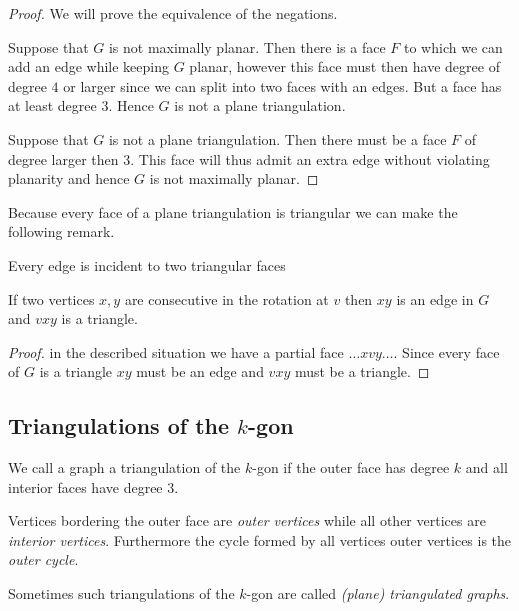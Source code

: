 \begin{proof}
We will prove the equivalence of the negations.

Suppose that $G$ is not maximally planar. Then there is a face $F$ to which we can add an edge while keeping $G$ planar, however this face must then have degree of degree $4$ or larger since we can split into two faces with an edges. But a face has at least degree 3. Hence $G$ is not a plane triangulation.

Suppose that $G$ is not a plane triangulation. Then there must be a face $F$ of degree larger then $3$. This face will thus admit an extra edge without violating planarity and hence $G$ is not maximally planar.
\end{proof}

Because every face of a plane triangulation is triangular we can make the following remark.

\begin{remark}
  Every edge is incident to two triangular faces
\end{remark}

\begin{lemma}
  \label{lm:prelim:rotationEdge}
  If two vertices $x, y$ are consecutive in the rotation at $v$ then $xy$ is an edge in $G$ and $vxy$ is a triangle.
\end{lemma}
\begin{proof}
  in the described situation we have a partial face $\ldots x v y \ldots$.  Since every face of $G$ is a triangle $xy$ must be an edge and $vxy$ must be a triangle.
\end{proof}

\subsection{Triangulations of the $k$-gon}

\begin{defi}
We call a graph a triangulation of the $k$-gon if the outer face has degree $k$ and all interior faces have degree $3$.
\end{defi}
Vertices bordering the outer face are \emph{outer vertices} while all other vertices are \emph{interior vertices}. Furthermore the cycle formed by all vertices outer vertices is the \emph{outer cycle}.

Sometimes such triangulations of the $k$-gon are called \emph{(plane) triangulated graphs}.
